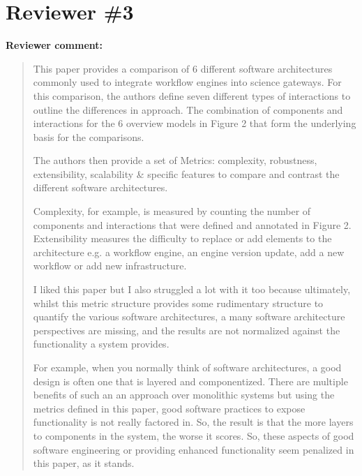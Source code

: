 \documentclass[a4]{article}
\newenvironment{review}%
{\textbf{Reviewer comment:}\begin{quote}}%
{\end{quote}}%
\begin{document}
\section{Reviewer \#3}

\begin{review}
  This paper provides a comparison of 6 different software
  architectures commonly used to integrate workflow engines into
  science gateways. For this comparison, the authors define seven
  different types of interactions to outline the differences in
  approach. The combination of components and interactions for the 6
  overview models in Figure 2 that form the underlying basis for the
  comparisons.

  The authors then provide a set of Metrics: complexity, robustness,
  extensibility, scalability \& specific features to compare and
  contrast the different software architectures.

  Complexity, for example, is measured by counting the number of
  components and interactions that were defined and annotated in
  Figure 2.  Extensibility measures the difficulty to replace or add
  elements to the architecture e.g. a workflow engine, an engine
  version update, add a new workflow or add new infrastructure.

  I liked this paper but I also struggled a lot with it too because
  ultimately, whilst this metric structure provides some rudimentary
  structure to quantify the various software architectures, a many
  software architecture perspectives are missing, and the results are
  not normalized against the functionality a system provides.

  For example, when you normally think of software architectures, a
  good design is often one that is layered and componentized. There
  are multiple benefits of such an an approach over monolithic systems
  but using the metrics defined in this paper, good software practices
  to expose functionality is not really factored in. So, the result is
  that the more layers to components in the system, the worse it
  scores. So, these aspects of good software engineering or providing
  enhanced functionality seem penalized in this paper, as it stands.
\end{review}
\end{document}
